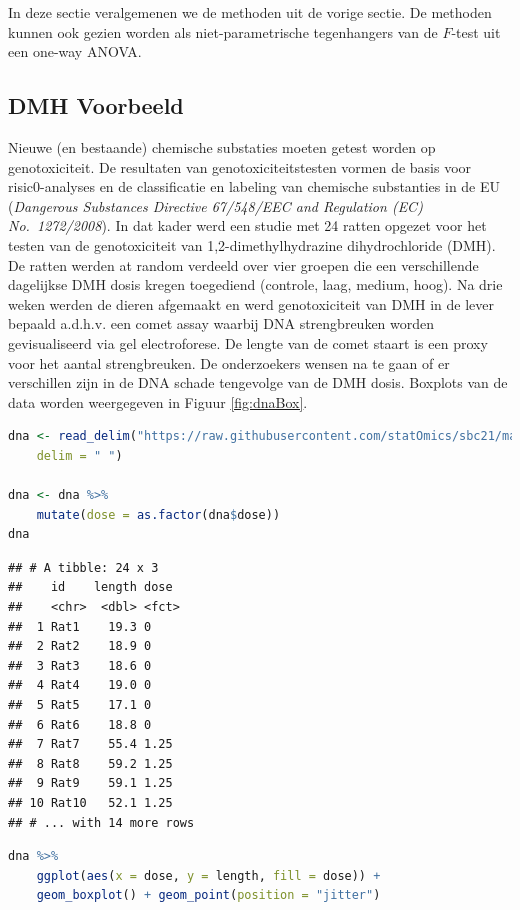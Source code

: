 \documentclass[
  12pt,dutch,coursenotes]{book}
\theoremstyle{definition}
\theoremstyle{definition}
\theoremstyle{definition}
\theoremstyle{definition}
\theoremstyle{remark}
\begin{document}
In deze sectie veralgemenen we de methoden uit de vorige sectie.
De methoden kunnen ook gezien worden
als niet-parametrische tegenhangers van de \(F\)-test uit een one-way ANOVA.

\hypertarget{dmh-voorbeeld}{%
\subsection{DMH Voorbeeld}\label{dmh-voorbeeld}}

Nieuwe (en bestaande) chemische substaties moeten getest worden op genotoxiciteit. De resultaten van genotoxiciteitstesten vormen de basis voor risic0-analyses en de classificatie en labeling van chemische substanties in de EU (\emph{Dangerous Substances Directive 67/548/EEC and Regulation (EC) No.~1272/2008}). In dat kader werd een studie met 24 ratten opgezet voor het testen van de genotoxiciteit van 1,2-dimethylhydrazine dihydrochloride (DMH).
De ratten werden at random verdeeld over vier groepen die een verschillende dagelijkse DMH dosis kregen toegediend (controle, laag, medium, hoog).
Na drie weken werden de dieren afgemaakt en werd genotoxiciteit van DMH in de lever bepaald a.d.h.v. een comet assay waarbij DNA strengbreuken worden gevisualiseerd via gel electroforese.
De lengte van de comet staart is een proxy voor het aantal strengbreuken.
De onderzoekers wensen na te gaan of er verschillen zijn in de DNA schade tengevolge van de DMH dosis.
Boxplots van de data worden weergegeven in Figuur \ref{fig:dnaBox}.

\begin{lstlisting}[language=R]
dna <- read_delim("https://raw.githubusercontent.com/statOmics/sbc21/master/data/dna.txt",
    delim = " ")

dna <- dna %>%
    mutate(dose = as.factor(dna$dose))
dna
\end{lstlisting}

\begin{lstlisting}
## # A tibble: 24 x 3
##    id    length dose 
##    <chr>  <dbl> <fct>
##  1 Rat1    19.3 0    
##  2 Rat2    18.9 0    
##  3 Rat3    18.6 0    
##  4 Rat4    19.0 0    
##  5 Rat5    17.1 0    
##  6 Rat6    18.8 0    
##  7 Rat7    55.4 1.25 
##  8 Rat8    59.2 1.25 
##  9 Rat9    59.1 1.25 
## 10 Rat10   52.1 1.25 
## # ... with 14 more rows
\end{lstlisting}

\begin{lstlisting}[language=R]
dna %>%
    ggplot(aes(x = dose, y = length, fill = dose)) +
    geom_boxplot() + geom_point(position = "jitter")
\end{lstlisting}
\end{document}
